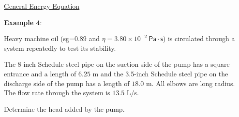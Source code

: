 \documentclass[10pt]{amsart}
\begin{document}
\begin{multicols}{2}
{	}

	\vfill
	\columnbreak

	\parb
	\underline{General Energy Equation}
	\parb

	\vfill





	\pagebreak
\end{multicols}


\textbf{Example 4}:

\begin{multicols}{2}
	Heavy machine oil (sg=$0.89$ and $\eta=3.80\times10^{-2}\mathsf{\ Pa\cdot s}$) is circulated through a system repeatedly to test its stability. \par\medskip
	The 8-inch Schedule steel pipe on the suction side of the pump has a square entrance and a length of $6.25$ m and the
	3.5-inch Schedule steel pipe on the discharge side of the pump has a length of $18.0$ m. All elbows are long
	radius. The flow rate through the system is $13.5$ L/s. \par\medskip
	Determine the head added by the pump. \par\medskip
	\columnbreak

\end{multicols}
\end{document}
